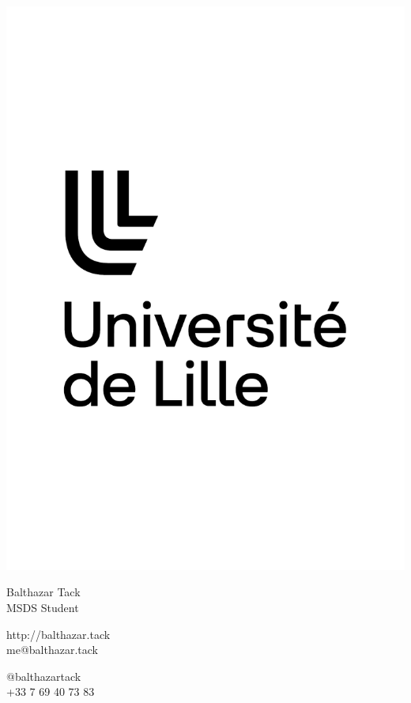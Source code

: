 \documentclass{article}
\begin{document}
\centering \includegraphics[width=.25\linewidth]{logo}\\[5pt]
\parbox{2in}{\Large \centering Balthazar Tack\\[1pt]
\normalsize MSDS Student}

\vfill
\raggedright
\begin{multicols}{2}
http://balthazar.tack\\
me@balthazar.tack

\columnbreak
\raggedleft
@balthazartack\\
+33 7 69 40 73 83%
\end{multicols}%
\end{document}
